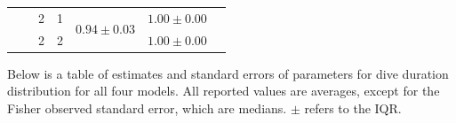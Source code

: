\documentclass[12pt]{TD-CJS}
\begin{document}
{\begin{tabular}{ccccccc}
                            &                                    & 2                             & 1                                & \multirow{2}{*}{$0.94\pm0.03$}    & $1.00 \pm 0.00$                       \\ 
                            &                                    & 2                             & 2                                &                                   & $1.00 \pm 0.00$                       \\ \hline
\end{tabular}
}


\newpage
Below is a table of estimates and standard errors of parameters for dive duration distribution for all four models. All reported values are averages, except for the Fisher observed standard error, which are medians. $\pm$ refers to the IQR.
\vspace{1cm}
\end{document}
